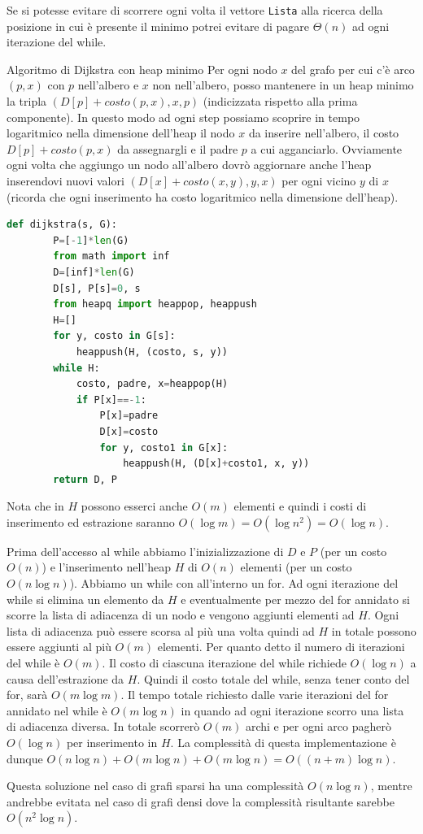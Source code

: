 Se si potesse evitare di scorrere ogni volta il vettore \verb|Lista| alla ricerca della posizione in cui è presente il minimo potrei evitare di pagare $\Theta(n)$ ad ogni iterazione del while. 

\begin{Algoritmo}{Algoritmo di Dijkstra con heap minimo}{}
     Per ogni nodo $x$ del grafo per cui c'è arco $(p, x)$ con $p$ nell'albero e $x$ non nell’albero, posso mantenere in un heap minimo la tripla $(D[p]+costo(p, x), x, p)$ (indicizzata rispetto alla prima componente). In questo modo ad ogni step possiamo scoprire in tempo logaritmico nella dimensione dell'heap il nodo $x$ da inserire nell'albero, il costo $D[p]+costo(p, x)$ da assegnargli e il padre $p$ a cui agganciarlo. Ovviamente ogni volta che aggiungo un nodo all'albero dovrò aggiornare anche l'heap inserendovi nuovi valori $(D[x]+costo(x, y), y, x)$ per ogni vicino $y$ di $x$ (ricorda che ogni
inserimento ha costo logaritmico nella dimensione dell'heap).

    \begin{lstlisting}[language=Python]
    def dijkstra(s, G):
        P=[-1]*len(G)
        from math import inf
        D=[inf]*len(G)
        D[s], P[s]=0, s
        from heapq import heappop, heappush
        H=[]
        for y, costo in G[s]:
            heappush(H, (costo, s, y))
        while H:
            costo, padre, x=heappop(H)
            if P[x]==-1:
                P[x]=padre
                D[x]=costo
                for y, costo1 in G[x]:
                    heappush(H, (D[x]+costo1, x, y))
        return D, P
    \end{lstlisting}

    Nota che in $H$ possono esserci anche $O(m)$ elementi e quindi i costi di inserimento ed estrazione saranno $O(\log m) = O(\log n^2) = O(\log n)$.
    
    Prima dell’accesso al while abbiamo l’inizializzazione di $D$ e $P$ (per un costo $O(n)$) e l’inserimento nell’heap $H$ di $O(n)$ elementi (per un costo $O(n \log n)$). Abbiamo un while con all’interno un for.
    Ad ogni iterazione del while si elimina un elemento da $H$ e eventualmente per mezzo del for annidato si scorre la lista di adiacenza di un nodo e vengono aggiunti elementi ad $H$. Ogni lista di adiacenza può essere scorsa al più una volta quindi ad $H$ in totale possono essere aggiunti al più $O(m)$ elementi. Per quanto detto il numero di iterazioni del while è $O(m)$. Il costo di ciascuna iterazione del while richiede $O(\log n)$ a causa dell’estrazione da $H$. Quindi il costo totale del while, senza tener conto del for, sarà $O(m \log m)$. Il tempo totale richiesto dalle varie iterazioni del for annidato nel while è $O(m \log n)$ in quando ad ogni iterazione scorro una lista di adiacenza diversa. In totale scorrerò $O(m)$ archi e per ogni arco pagherò $O(\log n)$ per inserimento in $H$. La complessità di questa implementazione è dunque $O(n \log n) + O(m \log n) + O(m \log n) = O((n + m) \log n)$.

    Questa soluzione nel caso di grafi sparsi ha una complessità $O(n \log n)$, mentre andrebbe evitata nel caso di grafi densi dove la complessità risultante sarebbe $O(n^2 \log n)$.
\end{Algoritmo}

